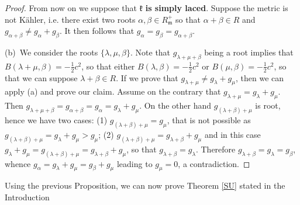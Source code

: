 \documentclass{amsart}
\numberwithin{equation}{section}
\theoremstyle{definition}
\renewcommand{\1}{\mathds{1}}
\renewcommand{\a}{\alpha}
\renewcommand{\b}{\beta}
\newcommand{\gk}{\mathfrak k}
\newcommand{\gm}{\mathfrak m}
\renewcommand{\>}{\rightarrow}
\begin{document}
\begin{proof}
From now on we suppose that $\gk$ {\bf is simply laced}. Suppose the metric is not K\"ahler, i.e. there exist two roots $\a,\b\in R_\gm^+$ so that $\a+\b\in R$ and  $g_{\a+\b}\neq g_\a+g_\b$. It then follows that $g_\a=g_\b=g_{\a+\b}$.\par
(b)\ We consider the roots $\{\lambda,\mu,\beta\}$. Note that $g_{\lambda+\mu+\beta}$ being a root implies that $B(\lambda+\mu,\beta)=-\frac 12 c^2$, so that either $B(\lambda,\beta)=-\frac 12 c^2$ or $B(\mu,\b)=-\frac 12 c^2$, so that we can suppose $\lambda+\beta\in R$.  If we prove that $g_{\lambda+\mu} \neq g_\lambda+g_\mu$, then we can apply (a) and prove our claim.
Assume on the contrary that $g_{\lambda+\mu} = g_\lambda+g_\mu$. Then $g_{\lambda+\mu+\beta}=g_{\a+\b}= g_\a = g_\lambda + g_\mu$. On the other hand $g_{(\lambda+\beta)+\mu}$ is root, hence we have two cases: (1) $g_{(\lambda+\beta)+\mu}=g_\mu$, that is not possible as $g_{(\lambda+\beta)+\mu}= g_\lambda + g_\mu > g_\mu$; (2) $g_{(\lambda+\beta)+\mu}=g_{\lambda+\b}+g_\mu$ and in this case $g_\lambda+g_\mu=g_{(\lambda+\beta)+\mu}=g_{\lambda+\b}+g_\mu$, so that
$g_{\lambda+\b}=g_\lambda$. Therefore $g_{\lambda+\b}=g_\lambda=g_\b$, whence $g_\a=g_\lambda + g_\mu = g_\b + g_\mu$ leading to $g_\mu=0$, a contradiction.
\end{proof}

 Using the previous Proposition, we can now prove Theorem \ref{SU} stated in the Introduction
\end{document}
